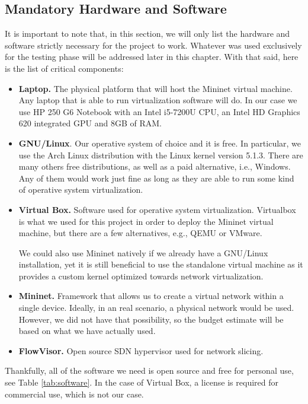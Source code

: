 \subsection{Mandatory Hardware and Software}
It is important to note that, in this section, we will only list the hardware and software strictly necessary for the project to work. Whatever was used exclusively for the testing phase will be addressed later in this chapter. With that said, here is the list of critical components:

\begin{itemize}
    \item \textbf{Laptop.} The physical platform that will host the Mininet virtual machine. Any laptop that is able to run virtualization software will do. In our case we use HP 250 G6 Notebook with an Intel i5-7200U CPU, an Intel HD Graphics 620 integrated GPU and 8GB of RAM.
    
    \item \textbf{GNU/Linux}. Our operative system of choice and it is free. In particular, we use the Arch Linux distribution with the Linux kernel version 5.1.3. There are many others free  distributions, as well as a paid alternative, i.e., Windows. Any of them would work just fine as long as they are able to run some kind of operative system virtualization.
    
    \item \textbf{Virtual Box.} Software used for operative system virtualization. Virtualbox is what we used for this project in order to deploy the Mininet virtual machine, but there are a few alternatives, e.g., QEMU or VMware. 
    
    We could also use Mininet natively if we already have a GNU/Linux installation, yet it is still beneficial to use the standalone virtual machine as it provides a custom kernel optimized towards network virtualization.
    
    \item \textbf{Mininet.} Framework that allows us to create a virtual network within a single device. Ideally, in an real scenario, a physical network would be used. However, we did not have that possibility, so the budget estimate will be based on what we have actually used.
    
    \item \textbf{FlowVisor.} Open source SDN hypervisor used for network slicing.
\end{itemize}

Thankfully, all of the software we need is open source and free for personal use, see Table \ref{tab:software}. In the case of Virtual Box, a license is required for commercial use, which is not our case.

